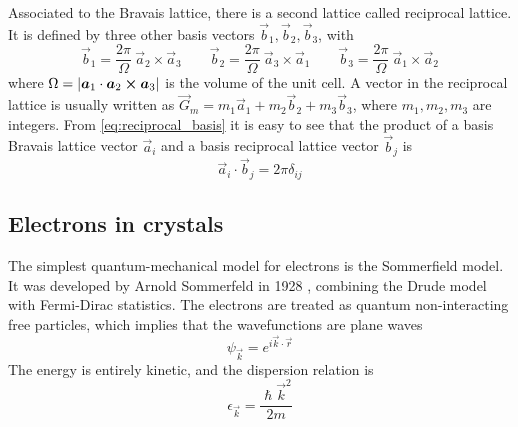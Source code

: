 Associated to the Bravais lattice, there is a second lattice called reciprocal lattice. It is defined by three other basis vectors $\vec{b}_1, \vec{b}_2, \vec{b}_3$, with
\begin{equation} \label{eq:reciprocal_basis}
    \vec{b}_1 = \frac{2\pi}{\Omega} \ \vec{a}_2 \times \vec{a}_3
    \qquad
    \vec{b}_2 = \frac{2\pi}{\Omega} \ \vec{a}_3 \times \vec{a}_1
    \qquad
    \vec{b}_3 = \frac{2\pi}{\Omega} \ \vec{a}_1 \times \vec{a}_2
\end{equation}
where $\Omega = \left| \mathbf{\boldsymbol{a}}_1 \cdot \mathbf{\boldsymbol{a}}_2 \cross \mathbf{\boldsymbol{a}}_3 \right|$ is the volume of the unit cell. A vector in the reciprocal lattice is usually written as $\vec{G}_m = m_1\vec{a}_1 + m_2\vec{b}_2 + m_3\vec{b}_3$, where $m_1, m_2, m_3$ are integers. From \cref{eq:reciprocal_basis} it is easy to see that the product of a basis Bravais lattice vector $\vec{a}_i$ and a basis reciprocal lattice vector $\vec{b}_j$ is
\begin{equation}
    \vec{a}_i \cdot \vec{b}_j = 2\pi \delta_{ij}
\end{equation}

\subsection{Electrons in crystals} \label{sec:electrons}
The simplest quantum-mechanical model for electrons is the Sommerfield model. It was developed by Arnold Sommerfeld in 1928 \cite{sommerfeldZurElektronentheorieMetalle1928}, combining the Drude model \cite{drude1900a} with Fermi-Dirac statistics. The electrons are treated as quantum non-interacting free particles, which implies that the wavefunctions are plane waves
\begin{equation} \label{eq:plane_wave}
    \psi_\vec{k} = e^{i\vec{k}\cdot\vec{r}}
\end{equation}
The energy is entirely kinetic, and the dispersion relation is
\begin{equation} \label{eq:free_dispersion}
    \epsilon_\vec{k} = \frac{\hslash \vec{k}^2}{2m}
\end{equation}

